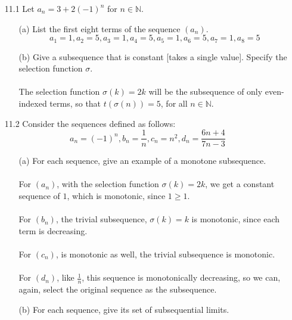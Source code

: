 
\usepackage{amsmath, dsfont}

\oddsidemargin 0in
\evensidemargin 0in
\textwidth 6.5in
\topmargin -0.5in
\textheight 9.0in
\newcommand{\norm}[1]{\left\lVert #1 \right\rVert}
\newcommand{\abs}[1]{\left\vert #1 \right\vert}
\newcommand{\?}{\stackrel{?}{=}}



\pagestyle{myheadings}

\begin{itemize}
  \item [11.1]
    Let $a_n = 3 + 2(-1)^n$ for $n \in \mathds{N}$.
    \begin{itemize}
      \item [(a)] List the first eight terms of the sequence $(a_n)$.        
        $$a_1 = 1, a_2 = 5, a_3 = 1, a_4 = 5, a_5 = 1, a_6 = 5, a_7 = 1, a_8 = 5$$


      \item [(b)] Give a subsequence that is constant [takes a single value]. Specify the selection function $\sigma$.\\\\

        The selection function $\sigma(k) = 2k$ will be the subsequence of only even-indexed terms, so that $t(\sigma(n)) = 5$, for all $n \in \mathds{N}$.
    \end{itemize}
  \item [11.2]
    Consider the sequences defined as follows:
    $$a_n = (-1)^n, b_n = \frac{1}{n}, c_n = n^2, d_n = \frac{6n+4}{7n-3}$$
    \begin{itemize}
      \item [(a)] For each sequence, give an example of a monotone subsequence.\\\\

        For $(a_n)$, with the selection function $\sigma(k) = 2k$, we get a constant sequence of $1$, which is monotonic, since $1 \geq 1$.\\\\
        For $(b_n)$, the trivial subsequence, $\sigma(k) = k$ is monotonic, since each term is decreasing.\\\\
        For $(c_n)$, is monotonic as well, the trivial subsequence is monotonic.\\\\
        For $(d_n)$, like $\frac{1}{n}$, this sequence is monotonically decreasing, so we can, again, select the original sequence as the subsequence.\\
      \item [(b)] For each sequence, give its set of subsequential limits.\\\\
        

\end{itemize}
\end{itemize}
